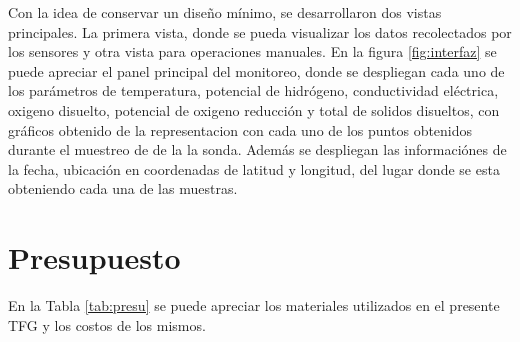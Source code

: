 Con la idea de conservar un dise\~no m\'inimo, se desarrollaron dos vistas principales. La primera vista, donde se pueda visualizar los datos recolectados por los sensores y otra vista para operaciones manuales. En la figura \ref{fig:interfaz} se puede apreciar el panel principal del monitoreo, donde se despliegan cada uno de los parámetros de temperatura, potencial de hidrógeno, conductividad eléctrica, oxigeno disuelto, potencial de oxigeno reducción y total de solidos disueltos, con gráficos obtenido de la representacion  con cada uno de los puntos obtenidos durante el muestreo de de la la sonda. Además se despliegan las informaci\'ones de la fecha, ubicación en coordenadas de latitud y longitud, del lugar donde se esta obteniendo cada una de las muestras.
\section[Presupuesto]{Presupuesto}
En la Tabla \ref{tab:presu} se puede apreciar los materiales utilizados en el presente TFG y los costos de los mismos.

